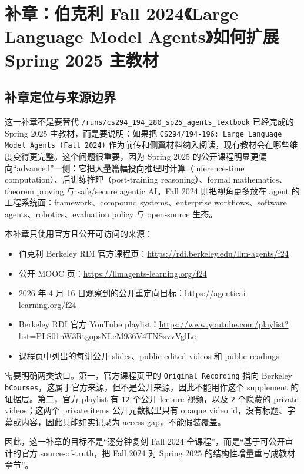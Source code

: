 \chapter{补章：伯克利 Fall 2024《Large Language Model Agents》如何扩展 Spring 2025 主教材}

\section{补章定位与来源边界}

这一补章不是要替代 \texttt{/runs/cs294\_194\_280\_sp25\_agents\_textbook} 已经完成的 Spring 2025 主教材，而是要说明：如果把 \texttt{CS294/194-196: Large Language Model Agents (Fall 2024)} 作为前传和侧翼材料纳入阅读，现有教材会在哪些维度变得更完整。这个问题很重要，因为 Spring 2025 的公开课程明显更偏向“advanced”一侧：它把大量篇幅投向推理时计算（inference-time computation）、后训练推理（post-training reasoning）、formal mathematics、theorem proving 与 safe/secure agentic AI。Fall 2024 则把视角更多放在 agent 的工程系统面：framework、compound systems、enterprise workflows、software agents、robotics、evaluation policy 与 open-source 生态。

本补章只使用官方且公开可访问的来源：
\begin{itemize}
\item 伯克利 Berkeley RDI 官方课程页：\url{https://rdi.berkeley.edu/llm-agents/f24}
\item 公开 MOOC 页：\url{https://llmagents-learning.org/f24}
\item 2026 年 4 月 16 日观察到的公开重定向目标：\url{https://agenticai-learning.org/f24}
\item Berkeley RDI 官方 YouTube playlist：\url{https://www.youtube.com/playlist?list=PLS01nW3RtgopsNLeM936V4TNSsvvVglLc}
\item 课程页中列出的每讲公开 slides、public edited videos 和 public readings
\end{itemize}

需要明确两类缺口。第一，官方课程页里的 \texttt{Original Recording} 指向 Berkeley \texttt{bCourses}，这属于官方来源，但不是公开来源，因此不能用作这个 supplement 的证据层。第二，官方 playlist 有 \texttt{12} 个公开 lecture 视频，以及 \texttt{2} 个隐藏的 private videos；这两个 private items 公开元数据里只有 opaque video id，没有标题、字幕或内容，因此只能如实记录为 access gap，不能假装覆盖。

因此，这一补章的目标不是“逐分钟复刻 Fall 2024 全课程”，而是“基于可公开审计的官方 source-of-truth，把 Fall 2024 对 Spring 2025 的结构性增量重写成教材章节”。

